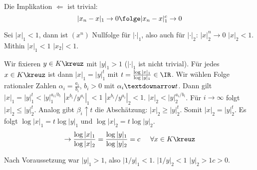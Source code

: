 
\renewcommand{\lecdate}{07.01.2015}

\begin{Beweis}
 Die Implikation $\Leftarrow$ ist trivial: \[ |x_n-x|_1\rightarrow 0 \folge |x_n-x|_1^c\rightarrow 0\]
 
 \Hinrichtung Sei $|x|_1<1$, dann ist $(x^n)$ Nullfolge für $|\cdot|_1$, also auch für $|\cdot|_2$: $|x|^n_2\rightarrow 0$ \folge $|x|_2<1$. Mithin $|x|_1<1$ \gdw $|x_2|<1$. 
 
 Wir fixieren $y\in K\kreuz$ mit $|y|_1>1$ ($|\cdot|_1$ ist nicht trivial). Für jedes $x\in K\kreuz$ ist dann $|x|_1=|y|_1^t$ mit $t=\frac{\log |x|_1}{\log |y|_1}\in\IR$. Wir wählen Folge rationaler Zahlen $\alpha_i=\frac{a_i}{b_i}$, $b_i>0$ mit $\alpha_i\textdownarrow t$. Dann gilt $|x|_1=|y|_1^t<|y|_1^{a_i/b_i}$ \folge $|x^{b_i}/y^{a_i}|_1<1$ \folge $|x^{b_i}/y^{a_i}|_2<1$. \folge $|x|_2<|y|_2^{a_i/b_i}$. Für $i\rightarrow \infty$ folgt $|x|_2\leq |y|_2^t$. Analog gibt $\beta_i\uparrow t$ die Abschätzung: $|x|_2\geq |y|_2^t$. Somit $|x|_2=|y|_2^t$. Es folgt $\log |x|_1=t\log |y|_1$ und $\log |x|_2=t\log |y|_2$.
 \[\rightarrow \frac{\log |x|_1}{\log |x|_2}=\frac{\log |y|_1}{\log |y|_2}=c \hspace{.5cm}\forall x\in K\kreuz \]
 
 Nach Voraussetzung war $|y|_1>1$, also $|1/y|_1<1$. \folge $|1/y|_2<1$ \folge $|y|_2>1$\folge $c>0$.
\end{Beweis}

